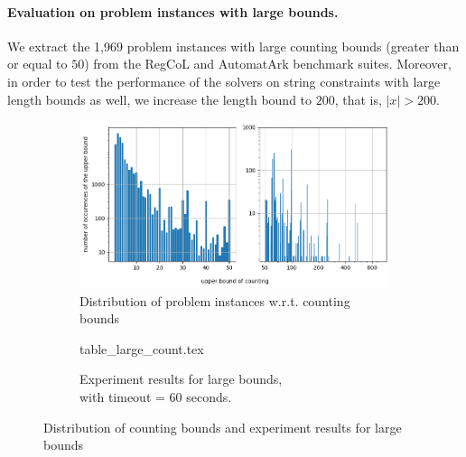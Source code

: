 \paragraph*{Evaluation on problem instances with large bounds.}
%
We extract the 1,969 problem instances with large counting bounds (greater than or equal to $50$) from the RegCoL and AutomatArk benchmark suites.  
Moreover, in order to test the performance of the solvers on string constraints with large length bounds as well, we increase the length bound to $200$, that is, $|x| > 200$.
\vspace{-5mm}
\begin{figure}[ht]
  \centering
  \begin{subfigure}[t]{0.49\textwidth}
    \centering\vskip 0pt
    \includegraphics[width=1\textwidth]{counting_distribution.png}  
    \caption{Distribution of problem instances w.r.t. counting bounds}  
    \label{fig:count_distri}
  \end{subfigure}
  \hfill
  \begin{subfigure}[t]{0.49\textwidth}
    \centering\vskip 0pt
    {table_large_count.tex}
    \vspace{4.5mm}
    \caption{Experiment results for large bounds, \\with timeout = 60 seconds.}
    \label{fig:table_large_count}
  \end{subfigure}
  \vspace{-2mm}
  \caption{Distribution of counting bounds and experiment results for large bounds}
\end{figure}
\vspace{-5mm}


